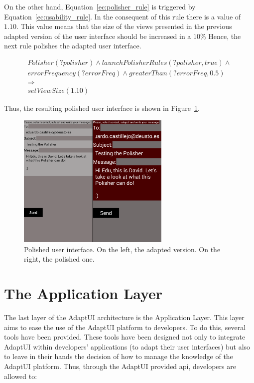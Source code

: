 On the other hand, Equation~\ref{ec:polisher_rule} is triggered by 
Equation~\ref{ec:usability_rule}. In the consequent of this rule there is 
a value of $1.10$. This value means that the size of the views presented in the
previous adapted version of the user interface should be increased in a $10\%$
Hence, the next rule polishes the adapted user
interface.

\footnotesize
\begin{equation} \label{ec:polisher_rule}
  \begin{align*} 
  Polisher(?polisher) ∧ launchPolisherRules(?polisher, true) ∧\\
  errorFrequency(?errorFreq) ∧ greaterThan(?errorFreq, 0.5)\\
  \Rightarrow \\
  setViewSize(1.10)
  \end{align*}
\end{equation}
\normalsize

Thus, the resulting polished user interface is shown in Figure~\ref{fig:polisher_4}.

\begin{figure}
\centering
\includegraphics[width=0.65\textwidth]{polisher_4.pdf}
\caption{Polished user interface. On the left, the adapted version. On the 
right, the polished one.}
\label{fig:polisher_4}
\end{figure}

\section{The Application Layer}
\label{sec:application_layer}

The last layer of the AdaptUI architecture is the Application Layer. This layer
aims to ease the use of the AdaptUI platform to developers. To do this, several
tools have been provided. These tools have been designed not only to integrate
AdaptUI within developers' applications (to adapt their user interfaces) but also
to leave in their hands the decision of how to manage the knowledge of the AdaptUI
platform. Thus, through the AdaptUI provided \ac{api}, developers are allowed to:

